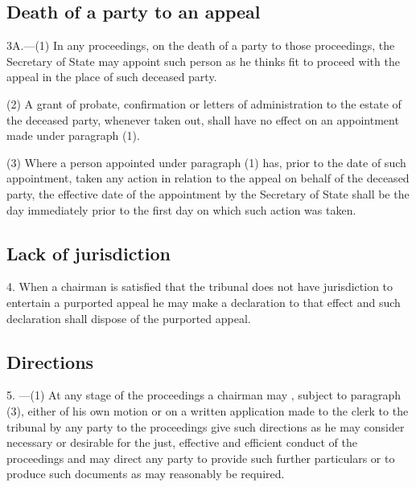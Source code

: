 \documentclass[12pt,a4paper]{article}
\begin{document}
\subsection[3A. Death of a party to an appeal]{Death of a party to an appeal}

3A.—(1) In any proceedings, on the death of a party to those proceedings, the Secretary of State may appoint such person as he thinks fit to proceed with the appeal in the place of such deceased party.

(2) A grant of probate, confirmation or letters of administration to the estate of the deceased party, whenever taken out, shall have no effect on an appointment made under paragraph (1).

(3) Where a person appointed under paragraph (1) has, prior to the date of such appointment, taken any action in relation to the appeal on behalf of the deceased party, the effective date of the appointment by the Secretary of State shall be the day immediately prior to the first day on which such action was taken.


\subsection[4. Lack of jurisdiction]{Lack of jurisdiction}

4.  When a chairman is satisfied that the tribunal does not have jurisdiction to entertain a purported appeal he may make a declaration to that effect and such declaration shall dispose of the purported appeal.

\subsection[5. Directions]{Directions}

5.%
---(1)  %
  At any stage of the proceedings a chairman may%
, subject to paragraph (3),  %
either of his own motion or on a written application made to the clerk to the tribunal by any party to the proceedings give such directions as he may consider necessary or desirable for the just, effective and efficient conduct of the proceedings and may direct any party to provide such further particulars or to produce such documents as may reasonably be required.
\end{document}
